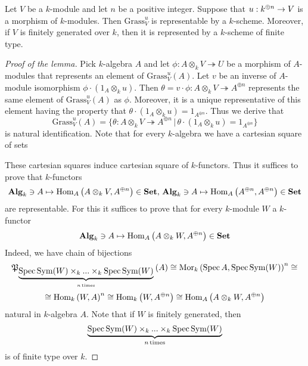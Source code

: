 \begin{lemma}\label{lemma:representability_of_open_chart}
Let $V$ be a $k$-module and let $n$ be a positive integer. Suppose that $u:k^{\oplus n}\rightarrow V$ is a morphism of $k$-modules. Then $\mathrm{Grass}_{V}^u$ is representable by a $k$-scheme. Moreover, if $V$ is finitely generated over $k$, then it is represented by a $k$-scheme of finite type.
\end{lemma}
\begin{proof}[Proof of the lemma]
Pick $k$-algebra $A$ and let $\phi:A\otimes_kV\twoheadrightarrow U$ be a morphism of $A$-modules that represents an element of $\mathrm{Grass}_{V}^u(A)$. Let $v$ be an inverse of $A$-module isomorphism $\phi\cdot \left(1_A\otimes_ku\right)$. Then $\theta = v\cdot \phi:A\otimes_kV\twoheadrightarrow A^{\oplus n}$ represents the same element of $\mathrm{Grass}_{V}^u(A)$ as $\phi$. Moreover, it is a unique representative of this element having the property that $\theta \cdot \left(1_A\otimes_k u\right) = 1_{A^{\oplus n}}$. Thus we derive that
$$\mathrm{Grass}_{V}^u(A) = \big\{\theta:A\otimes_kV\twoheadrightarrow A^{\oplus n}\,\big|\,\theta\cdot \left(1_A\otimes_ku\right) = 1_{A^{\oplus n}}\big\}$$
is natural identification. Note that for every $k$-algebra we have a cartesian square of sets
\begin{center}
\end{center}
These cartesian squares induce cartesian square of $k$-functors. Thus it suffices to prove that $k$-functors
$$\mathbf{Alg}_k\ni A\mapsto \mathrm{Hom}_A\left(A\otimes_kV,A^{\oplus n}\right)\in \mathbf{Set},\,\mathbf{Alg}_k\ni A\mapsto \mathrm{Hom}_A\left(A^{\oplus n},A^{\oplus n}\right)\in \mathbf{Set}$$
are representable. For this it suffices to prove that for every $k$-module $W$ a $k$-functor
$$\mathbf{Alg}_k\ni A\mapsto \mathrm{Hom}_A\left(A\otimes_kW,A^{\oplus n}\right)\in \mathbf{Set}$$
Indeed, we have chain of bijections
$${\mathfrak P}_{\underbrace{\mathrm{Spec}\, \textrm{Sym}(W)\times_k ... \times_k \mathrm{Spec}\, \textrm{Sym}(W)}_{n\,\mathrm{times}}}\left(A\right) \cong \mathrm{Mor}_k\left(\mathrm{Spec}\, A, \mathrm{Spec}\, \textrm{Sym}(W)\right)^n \cong$$
$$\cong \mathrm{Hom}_k\left(W,A\right)^n \cong \mathrm{Hom}_k\left(W, A^{\oplus n}\right) \cong \mathrm{Hom}_A\left(A\otimes_k W,A^{\oplus n}\right)$$
natural in $k$-algebra $A$. Note that if $W$ is finitely generated, then
$$\underbrace{\mathrm{Spec}\, \textrm{Sym}(W)\times_k ... \times_k \mathrm{Spec}\, \textrm{Sym}(W)}_{n\,\mathrm{times}}$$
is of finite type over $k$.
\end{proof}

